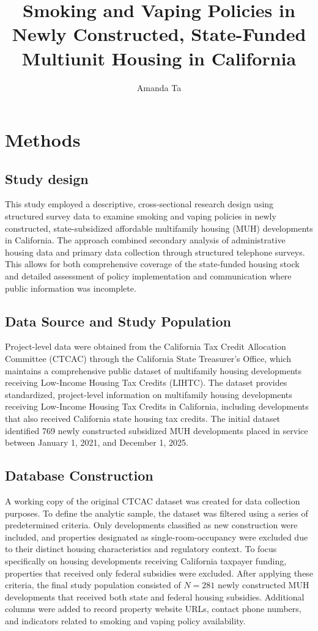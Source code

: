 \documentclass[man]{apa7}
\title{Smoking and Vaping Policies in Newly Constructed, State-Funded Multiunit Housing in California}
\author{Amanda Ta}
\affiliation{School of Public Health, San Diego State University}
\begin{document}
\maketitle

\section{Methods}

\subsection{Study design}

This study employed a descriptive, cross-sectional research design using structured survey data to examine smoking and vaping policies in newly constructed, state-subsidized affordable multifamily housing (MUH) developments in California. The approach combined secondary analysis of administrative housing data and primary data collection through structured telephone surveys. This allows for both comprehensive coverage of the state-funded housing stock and detailed assessment of policy implementation and communication where public information was incomplete.

\subsection{Data Source and Study Population}

Project-level data were obtained from the California Tax Credit Allocation Committee (CTCAC) through the California State Treasurer's Office, which maintains a comprehensive public dataset of multifamily housing developments receiving Low-Income Housing Tax Credits (LIHTC). The dataset provides standardized, project-level information on multifamily housing developments receiving Low-Income Housing Tax Credits in California, including developments that also received California state housing tax credits. The initial dataset identified 769 newly constructed subsidized MUH developments placed in service between January 1, 2021, and December 1, 2025.

\subsection{Database Construction}

A working copy of the original CTCAC dataset was created for data collection purposes. To define the analytic sample, the dataset was filtered using a series of predetermined criteria. Only developments classified as new construction were included, and properties designated as single-room-occupancy were excluded due to their distinct housing characteristics and regulatory context. To focus specifically on housing developments receiving California taxpayer funding, properties that received only federal subsidies were excluded. After applying these criteria, the final study population consisted of $N = 281$ newly constructed MUH developments that received both state and federal housing subsidies. Additional columns were added to record property website URLs, contact phone numbers, and indicators related to smoking and vaping policy availability.
\end{document}
